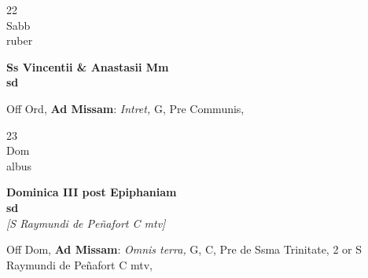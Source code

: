 \documentclass[10pt, openany]{book}
\begin{document}
        \begin{center}
            \begin{minipage}{3.5in}
                \vspace{2em}
                \begin{minipage}{0.5in}
                    {\Huge 22} \\
                    {\normalsize Sabb} \\
                    {\normalsize ruber}
                \end{minipage}
                \begin{minipage}{3.0in}
                    \textbf{ \large Ss Vincentii \& Anastasii Mm \\
                    \textnormal{\normalsize sd}} \\ 
                \end{minipage}
                \begin{justify}Off Ord, \textbf{Ad Missam}: \textit{Intret,} G, Pre Communis,  
                \end{justify}
            \end{minipage}
        \end{center}
    
        \begin{center}
            \begin{minipage}{3.5in}
                \vspace{2em}
                \begin{minipage}{0.5in}
                    {\Huge 23} \\
                    {\normalsize Dom} \\
                    {\normalsize albus}
                \end{minipage}
                \begin{minipage}{3.0in}
                    \textbf{ \large Dominica III post Epiphaniam \\
                    \textnormal{\normalsize sd}} \\ \textit{[S Raymundi de Peñafort C mtv]} \\ 
                \end{minipage}
                \begin{justify}Off Dom, \textbf{Ad Missam}: \textit{Omnis terra,} G, C, Pre de Ssma Trinitate, 2 or S Raymundi de Peñafort C mtv,  
                \end{justify}
            \end{minipage}
        \end{center}
    
\end{document}
